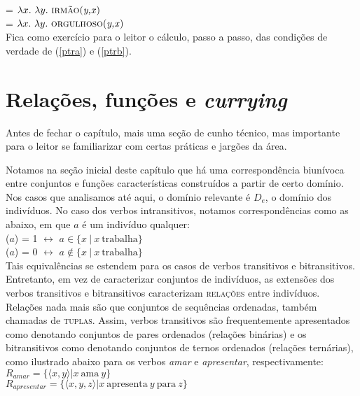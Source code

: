 \n {} = $\lambda x.\ \lambda y.\ \predica{irmão}{y,x}$\\

\n {} = $\lambda x.\ \lambda y.\ \predica{orgulhoso}{y,x}$\\

\n Fica como exercício para o leitor o cálculo, passo a passo, das
condições de verdade de (\ref{ptra}) e (\ref{ptrb}).

\section{Relações, funções e \textit{currying}}

Antes de fechar o capítulo, mais uma seção de cunho técnico, mas importante para o leitor se familiarizar com certas práticas e jargões da área.

Notamos na seção inicial deste capítulo que há uma correspondência biunívoca entre conjuntos e funções características construídos a partir de certo domínio. Nos casos que analisamos até aqui, o domínio relevante é $D_e$, o domínio dos indivíduos. No caso dos verbos intransitivos, notamos correspondências como as abaixo, em que $a$ é um indivíduo qualquer:\\

\n {}($a$) = 1 $\leftrightarrow$ $a \in \{x\ |\ x\ \text{trabalha} \}$ \\

\n {}($a$) = 0 $\leftrightarrow$ $a \notin \{x\ | \ x\ \text{trabalha} \}$ \\

\n Tais equivalências se
estendem para os casos de verbos transitivos e bitransitivos. Entretanto, em vez de caracterizar conjuntos de indivíduos, as extensões dos verbos transitivos e bitransitivos caracterizam \textsc{relações} entre indivíduos. Relações nada mais são que conjuntos de sequências ordenadas, também chamadas de \textsc{tuplas}. Assim, verbos transitivos são frequentemente apresentados como denotando conjuntos de pares ordenados (relações binárias) e os bitransitivos como denotando conjuntos de ternos ordenados (relações ternárias), como ilustrado abaixo para os verbos \textit{amar} e \textit{apresentar}, respectivamente:\\

\n $R_{amar} = \{\langle x,y \rangle | x\ \text{ama}\ y\}$\\

\n $R_{apresentar} = \{\langle x,y,z \rangle | x\ \text{apresenta}\ y\ \text{para}\ z\}$\\

